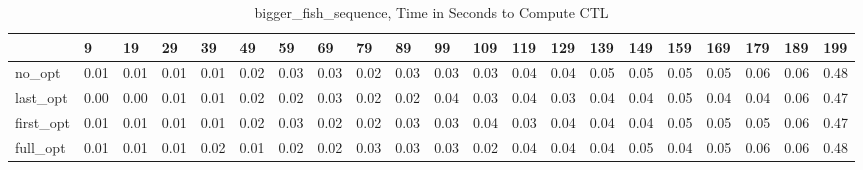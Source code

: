 \begin{table}
\caption{bigger_fish_sequence, Time in Seconds to Compute CTL}
\label{bigger_fish_sequence_CTL_time}
\begin{tabular}{lllllllllllllllllllll}
\toprule
 & 9 & 19 & 29 & 39 & 49 & 59 & 69 & 79 & 89 & 99 & 109 & 119 & 129 & 139 & 149 & 159 & 169 & 179 & 189 & 199 \\
\midrule
no_opt & 0.01 & 0.01 & 0.01 & 0.01 & 0.02 & 0.03 & 0.03 & 0.02 & 0.03 & 0.03 & 0.03 & 0.04 & 0.04 & 0.05 & 0.05 & 0.05 & 0.05 & 0.06 & 0.06 & 0.48 \\
last_opt & 0.00 & 0.00 & 0.01 & 0.01 & 0.02 & 0.02 & 0.03 & 0.02 & 0.02 & 0.04 & 0.03 & 0.04 & 0.03 & 0.04 & 0.04 & 0.05 & 0.04 & 0.04 & 0.06 & 0.47 \\
first_opt & 0.01 & 0.01 & 0.01 & 0.01 & 0.02 & 0.03 & 0.02 & 0.02 & 0.03 & 0.03 & 0.04 & 0.03 & 0.04 & 0.04 & 0.04 & 0.05 & 0.05 & 0.05 & 0.06 & 0.47 \\
full_opt & 0.01 & 0.01 & 0.01 & 0.02 & 0.01 & 0.02 & 0.02 & 0.03 & 0.03 & 0.03 & 0.02 & 0.04 & 0.04 & 0.04 & 0.05 & 0.04 & 0.05 & 0.06 & 0.06 & 0.48 \\
\bottomrule
\end{tabular}
\end{table}
